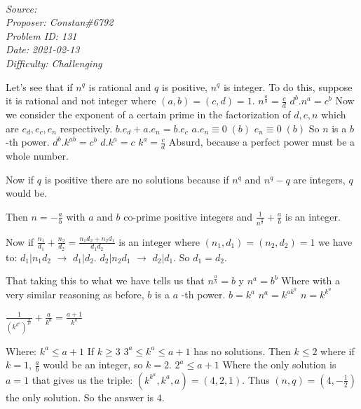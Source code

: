 \SSbreak\\
\emph{Source: \Cop}\\
\emph{Proposer: Constan\#6792}\\
\emph{Problem ID: 131}\\
\emph{Date: 2021-02-13}\\
\emph{Difficulty: Challenging}\\
\SSbreak

\bigskip

\begin{solution}\hfil\medskip
  
  Let's see that if $ n ^ q $ is rational and $ q $ is positive, $ n ^ q $ is integer.
To do this, suppose it is rational and not integer where $ (a, b) = (c, d) = 1 $.
$n^{\frac{a}{b}} = \frac{c}{d}$
$d^b . n^a = c^b$
Now we consider the exponent of a certain prime in the factorization of $ d, c, n $ which are $ e_d, e_c, e_n $ respectively.
$b. e_d + a .e_n = b. e_c$
$a.e_n \equiv 0 \; (b)$
$e_n \equiv 0 \; (b)$ 
So $ n $ is a $ b $ -th power.
$d^b . k^{ab} = c^b$
$d . k^a = c$
$k^a = \frac{c}{d}$
Absurd, because a perfect power must be a whole number.

Now if $ q $ is positive there are no solutions because if $ n ^ q $ and $ n ^ q-q $ are integers, $ q $ would be.

Then $n = -\frac{a}{b}$ with $ a $ and $ b $ co-prime positive integers and $ \frac {1} {n ^ {\frac {a}{b}}} + \frac {a}{b} $ is an integer.

Now if $\frac{n_1}{d_1} + \frac{n_2}{d_2} = \frac{n_1d_2+n_2d_1}{d_1d_2}$ is an integer where $(n_1, d_1) = (n_2, d_2) = 1$ we have to:
$d_1 | n_1d_2$ $\to$ $d_1|d_2$.
$d_2 | n_2d_1$ $\to$ $d_2|d_1$.
So $d_1 = d_2$.

That taking this to what we have tells us that $ n ^ {\frac {a} {b}} = b $ y
$ n ^ a = b ^ b $
Where with a very similar reasoning as before, $ b $ is a $ a $ -th power.
$b=k^a$
$n^a = k^{ak^a}$
$n=k^{k^a}$

$\frac{1}{(k^{k^a})^{\frac{a}{k^a}}} + \frac{a}{k^a} = \frac{a+1}{k^a}$

Where:
$ k ^ a \leq a + 1 $
If $ k \geq 3 $
$ 3 ^ a \leq k ^ a \leq a + 1$ has no solutions.
Then $ k \leq 2 $ where if $k=1$, $\frac{a}{b}$ would be an integer, so $ k = 2 $.
$ 2 ^ a \leq a + 1 $
Where the only solution is $a =1 $ that gives us the triple:
$(k^{k^a}, k^a, a) = (4, 2, 1)$.
Thus $ (n, q) = (4, - \frac {1} {2}) $ the only solution.
So the answer is $4$.
\end{solution}\bigskip
